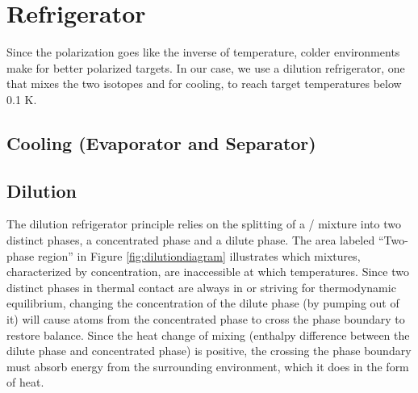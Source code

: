 \section{Refrigerator} 
Since the polarization goes like the inverse of temperature, colder environments make for better polarized targets.  In our case, we use a dilution refrigerator, one that mixes the two isotopes \het{} and \hef{} for cooling, to reach target temperatures below 0.1 K.

\subsection{\hef{}Cooling (Evaporator and Separator)}

\subsection{Dilution}

The dilution refrigerator principle relies on the splitting of a \het/\hef{} mixture into two distinct phases, a \het{} concentrated phase and a \het{} dilute phase.  The area labeled ``Two-phase region'' in Figure \ref{fig:dilutiondiagram} illustrates which mixtures, characterized by \het{} concentration, are inaccessible at which temperatures.  Since two distinct phases in thermal contact are always in or striving for thermodynamic equilibrium, changing the concentration of the dilute phase (by pumping \het{} out of it) will cause atoms from the concentrated phase to cross the phase boundary to restore balance.  Since the heat change of mixing (enthalpy difference between the dilute phase and concentrated phase) is positive, the \het{} crossing the phase boundary must absorb energy from the surrounding environment, which it does in the form of heat.\cite{hocktechniques}

